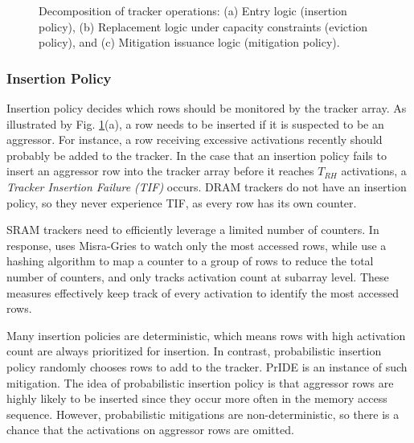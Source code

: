 \documentclass[journal,twocolumn]{IEEEtran}
\begin{document}
\begin{figure}[!t]
	\caption{Decomposition of tracker operations: (a) Entry logic (insertion policy), (b) Replacement logic under capacity constraints (eviction policy), and (c) Mitigation issuance logic (mitigation policy).}
	\label{fig:refreshpolicies}
\end{figure}

\subsubsection{Insertion Policy}\label{sec:insertion}

Insertion policy decides which rows should be monitored by the tracker array. As illustrated by Fig. \ref{fig:refreshpolicies}(a), a row needs to be inserted if it is suspected to be an aggressor. For instance, a row receiving excessive activations recently should probably be added to the tracker. In the case that an insertion policy fails to insert an aggressor row into the tracker array before it reaches $T_{RH}$ activations, a \textit{Tracker Insertion Failure (TIF)} occurs. DRAM trackers do not have an insertion policy, so they never experience TIF, as every row has its own counter.

SRAM trackers need to efficiently leverage a limited number of counters. In response, \cite{Kim23} uses Misra-Gries to watch only the most accessed rows, while \cite{Bostanci24, Nazaraliyev25} use a hashing algorithm to map a counter to a group of rows to reduce the total number of counters, and \cite{Taneja26} only tracks activation count at subarray level. These measures effectively keep track of every activation to identify the most accessed rows.

Many insertion policies are deterministic, which means rows with high activation count are always prioritized for insertion. In contrast, probabilistic insertion policy randomly chooses rows to add to the tracker. PrIDE\cite{Jaleel24} is an instance of such mitigation. The idea of probabilistic insertion policy is that aggressor rows are highly likely to be inserted since they occur more often in the memory access sequence. However, probabilistic mitigations are non-deterministic, so there is a chance that the activations on aggressor rows are omitted.
\end{document}
